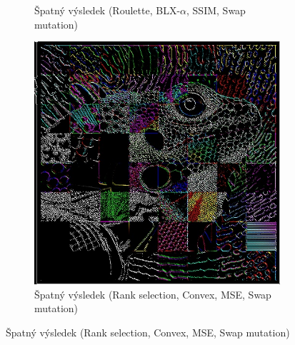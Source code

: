 \documentclass[a4paper,11pt]{scrartcl}
\begin{document}
\begin{figure}[!h]
\begin{subfigure}[b]{0.32\textwidth}
        \caption{Špatný výsledek (Roulette, BLX-$\alpha$, SSIM, Swap mutation)}
        \label{fig:ex22}
    \end{subfigure}
    \begin{subfigure}[b]{0.32\textwidth}
        \includegraphics[width=\textwidth]{img/ranksel-convex-mse-swap_example2.jpg}
        \caption{Špatný výsledek (Rank selection, Convex, MSE, Swap mutation)}
        \label{fig:ex23}
    \end{subfigure}
\end{figure}
\end{document}
